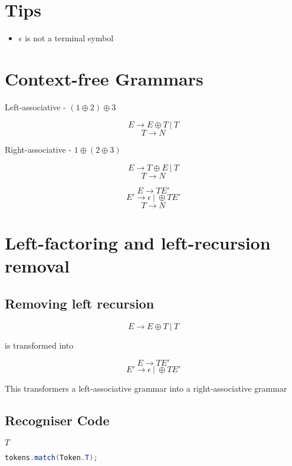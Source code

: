 \documentclass[fontsize=10pt,a4paper]{article}
\begin{document}
\begin{multicols}{3}
    \small
    \section{Tips}

    \begin{itemize}
        \item $\epsilon$ is not a terminal symbol
    \end{itemize}

    \section{Context-free Grammars}

    Left-associative - $(1 \oplus 2) \oplus 3$

    \[E \rightarrow E \oplus T ~\vert~ T\]
    \[T \rightarrow N\]

    Right-associative - $1 \oplus (2 \oplus 3)$

    \[E \rightarrow T \oplus E ~\vert~ T\]
    \[T \rightarrow N\]

    \[E \rightarrow TE'\]
    \[E' \rightarrow \epsilon ~\vert~ \oplus TE'\]
    \[T \rightarrow N\]


    \section{Left-factoring and left-recursion removal}


    \subsection{Removing left recursion}

    \[E \rightarrow E \oplus T ~\vert~ T\]

    is transformed into

    \[E \rightarrow TE'\]
    \[E' \rightarrow \epsilon ~\vert~ \oplus TE'\]

    This transformers a left-associative grammar into a right-associative grammar

    \subsection{Recogniser Code}

    $T$
    \begin{lstlisting}[language=Java, basicstyle=\tiny]
    tokens.match(Token.T);
    \end{lstlisting}


\end{multicols}
\end{document}
